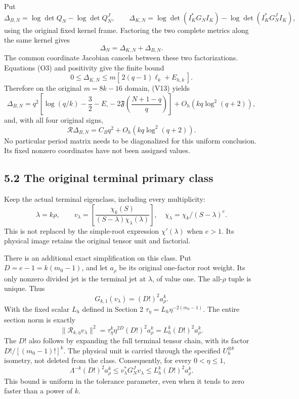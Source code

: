 \documentclass[11pt]{article}
\begin{document}
Put \[
 \Delta_{B,N}=\log\det Q_N-\log\det Q_N^J,\qquad
 \Delta_{K,N}=\log\det(I_K^*G_NI_K)-\log\det(I_K^*G_N^JI_K),
\] using the original fixed kernel frame. Factoring the two complete metrics along the same kernel gives \[
 \boxed{\Delta_N=\Delta_{K,N}+\Delta_{B,N}.} \tag{O5}
\] The common coordinate Jacobian cancels between these two factorizations. Equations (O3) and positivity give the finite bound \[
 \boxed{
 0\le\Delta_{K,N}
 \le m[\,2(q-1)\ell_k+E_{h,k}\,].
 } \tag{O6}
\] Therefore on the original \(m=8k-16\) domain, (V13) yields \[
 \boxed{
 \Delta_{B,N}
 =q^2\left[\log(q/k)-\frac32-E_\square
 -2\mathfrak F\!\left(\frac{N+1-q}{q}\right)\right]
 +O_h(kq\log^2(q+2)),
 } \tag{O7}
\] and, with all four original signs, \[
 \boxed{\mathcal R\Delta_{B,N}
 =C_Bq^2+O_h(kq\log^2(q+2)).} \tag{O8}
\] No particular period matrix needs to be diagonalized for this uniform conclusion. Its fixed nonzero coordinates have not been assigned values.

\subsection{5.2 The original terminal primary class}\label{the-original-terminal-primary-class}

Keep the actual terminal eigenclass, including every multiplicity: \[
 \lambda=k\rho,\qquad
 v_\lambda=
 \left[\frac{\chi_k(S)}
 {(S-\lambda)\chi_\lambda(\lambda)}\right],
 \quad \chi_\lambda=\chi_k/(S-\lambda)^e.
\] This is not replaced by the simple-root expression \(\chi'(\lambda)\) when \(e>1\). Its physical image retains the original tensor unit and factorial.

There is an additional exact simplification on this class. Put \(D=e-1=k(m_0-1)\), and let \(a_\rho\) be its original one-factor root weight. Its only nonzero divided jet is the terminal jet at \(\lambda\), of value one. The all-\(\rho\) tuple is unique. Thus \[
 G_{k,1}(v_\lambda)=(D!)^2a_\rho^k.
\] With the fixed scalar \(L_h\) defined in Section 2 \(\tau_\eta=L_h\eta^{-2(m_0-1)}\). The entire section norm is exactly \[
 \|\mathcal R_{k,\eta}v_\lambda\|^2
 =\tau_\eta^k\eta^{2D}(D!)^2a_\rho^k
 =L_h^k(D!)^2a_\rho^k.
\] The \(D!\) also follows by expanding the full terminal tensor chain, with its factor \(D!/[(m_0-1)!]^k\). The physical unit is carried through the specified \(U_h^{\otimes k}\) isometry, not deleted from the class. Consequently, for every \(0<\eta\le1\), \[
 \boxed{
 \Lambda^{-k}(D!)^2a_\rho^k
 \le v_\lambda^*G_N^Jv_\lambda
 \le L_h^k(D!)^2a_\rho^k.
 } \tag{O9a}
\] This bound is uniform in the tolerance parameter, even when it tends to zero faster than a power of \(k\).
\end{document}

